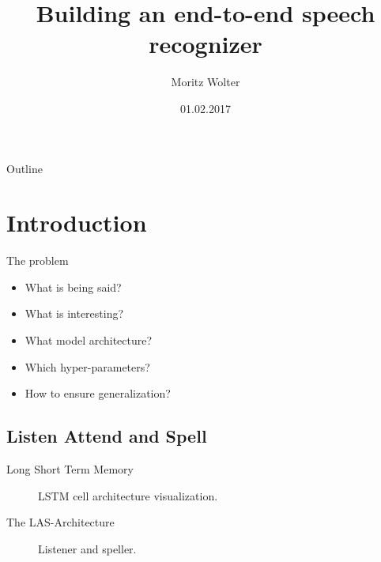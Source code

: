 \documentclass{beamer}
\title{Building an end-to-end speech recognizer}
\author{Moritz Wolter}
\date{01.02.2017}
\begin{document}
\begin{frame}
  \titlepage
\end{frame}


\begin{frame}{Outline}
  \tableofcontents
\end{frame}

\section{Introduction}
\begin{frame}{The problem}
	\begin{itemize}
		\item What is being said? 
		\item What is interesting?
		\item What model architecture?
		\item Which hyper-parameters?
		\item How to ensure generalization?
	\end{itemize}
\end{frame}

\subsection{Listen Attend and Spell}
\begin{frame}{Long Short Term Memory}
	\begin{figure}
		\caption{LSTM cell architecture visualization.}
	\end{figure}
\end{frame}


\begin{frame}{The LAS-Architecture}
	\begin{figure}
		\caption{Listener and speller.}
	\end{figure}
\end{frame}
\end{document}
